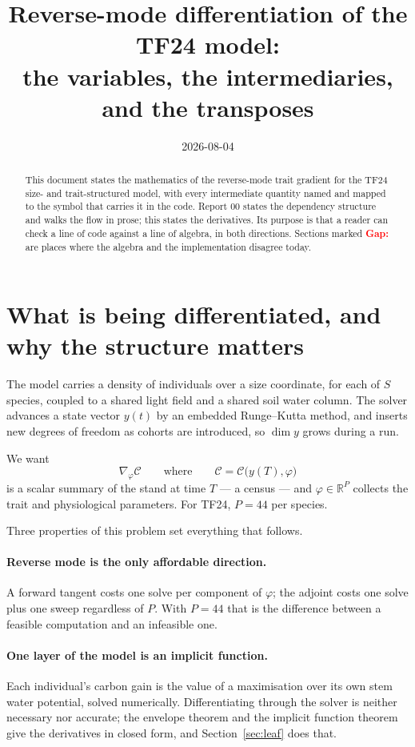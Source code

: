 \documentclass[11pt,a4paper]{article}
\title{Reverse-mode differentiation of the TF24 model:\\
the variables, the intermediaries, and the transposes}
\author{}
\date{2026-08-04}
\newcommand{\gap}[1]{\textcolor{red}{\textbf{Gap:} #1}}
\begin{document}
\maketitle

\begin{abstract}
This document states the mathematics of the reverse-mode trait gradient for the
TF24 size- and trait-structured model, with every intermediate quantity named and
mapped to the symbol that carries it in the code. Report 00 states the dependency
structure and walks the flow in prose; this states the derivatives. Its purpose is
that a reader can check a line of code against a line of algebra, in both
directions. Sections marked \gap{} are places where the algebra and the
implementation disagree today.
\end{abstract}

\tableofcontents

\section{What is being differentiated, and why the structure matters}

The model carries a density of individuals over a size coordinate, for each of
$S$ species, coupled to a shared light field and a shared soil water column. The
solver advances a state vector $y(t)$ by an embedded Runge--Kutta method, and
inserts new degrees of freedom as cohorts are introduced, so $\dim y$ grows during
a run.

We want
\begin{equation}
\nabla_\varphi \mathcal{C}
\qquad\text{where}\qquad
\mathcal{C} = \mathcal{C}\big(y(T), \varphi\big)
\label{eq:goal}
\end{equation}
is a scalar summary of the stand at time $T$ --- a census --- and
$\varphi \in \mathbb{R}^{P}$ collects the trait and physiological parameters. For
TF24, $P = 44$ per species.

Three properties of this problem set everything that follows.

\paragraph{Reverse mode is the only affordable direction.} A forward tangent costs
one solve per component of $\varphi$; the adjoint costs one solve plus one sweep
regardless of $P$. With $P = 44$ that is the difference between a feasible
computation and an infeasible one.

\paragraph{One layer of the model is an implicit function.} Each individual's
carbon gain is the value of a maximisation over its own stem water potential,
solved numerically. Differentiating through the solver is neither necessary nor
accurate; the envelope theorem and the implicit function theorem give the
derivatives in closed form, and Section~\ref{sec:leaf} does that.
\end{document}
